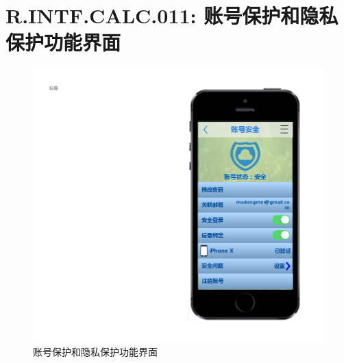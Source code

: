     \section{R.INTF.CALC.011: 账号保护和隐私保护功能界面}
    \begin{figure}[h]
        \centering
        \includegraphics[scale=0.6]{OutlineDesign/figures/账号保护和隐私保护功能界面.png}
        \caption{账号保护和隐私保护功能界面}
        \label{fig:server_flow}
    \end{figure}
    \newpage
